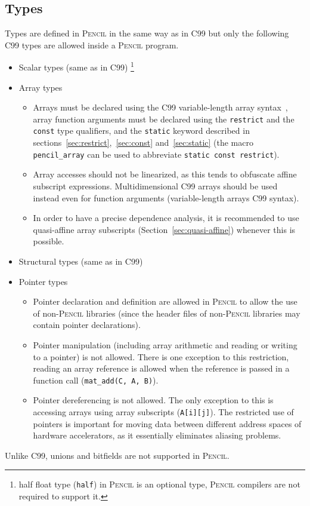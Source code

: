 \documentclass{carp}
\newcommand\pencil{\textsc{Pencil}\xspace}
\newcommand{\C}{C99\xspace}
\begin{document}
\subsection{Types\label{penciltypes}}
Types are defined in \pencil in the same way as in \C but
only the following \C types are allowed inside a \pencil program.
\begin{itemize}
  \item Scalar types (same as in \C)
      \footnote{half float type (\lstinline!half!) in \pencil is an optional
      type, \pencil compilers are not required to support it.}
  \item Array types
  \begin{itemize}
    \item Arrays must be declared using the C99
      variable-length array syntax~\cite{c99}, array function arguments
      must be declared using the \lstinline!restrict! and
      the \lstinline!const! type qualifiers, and the \lstinline!static! keyword
      described in sections~\ref{sec:restrict},~\ref{sec:const}
      and~\ref{sec:static} (the macro \lstinline!pencil_array! can be used to
      abbreviate \lstinline!static const restrict!).
    \item Array accesses should not be linearized, as this tends to
      obfuscate affine subscript expressions.  Multidimensional C99 arrays
      should be used instead even for function arguments (variable-length arrays
      C99 syntax).
    \item In order to have a precise dependence analysis, it is recommended
      to use quasi-affine array subscripts (Section~\ref{sec:quasi-affine})
      whenever this is possible.
  \end{itemize}
  \item Structural types (same as in \C)
  \item Pointer types
  \begin{itemize}
    \item Pointer declaration and definition are allowed in
      \pencil to allow the use of non-\pencil libraries (since the header files
      of non-\pencil libraries may contain pointer declarations).
    \item Pointer manipulation (including array arithmetic and reading or
      writing to a pointer) is not allowed.  There is one exception to this
      restriction, reading an array reference is allowed when the reference is
      passed in a function call (\eg \lstinline!mat_add(C, A, B)!).
    \item Pointer dereferencing is not allowed.  The only exception to
      this is accessing arrays using array subscripts
      (\eg \lstinline!A[i][j]!).
    The restricted use of pointers is important for moving data between
    different address spaces of hardware accelerators, as it essentially
    eliminates aliasing problems.
  \end{itemize}    
\end{itemize}
Unlike \C, unions and bitfields are not supported in \pencil.
\end{document}
